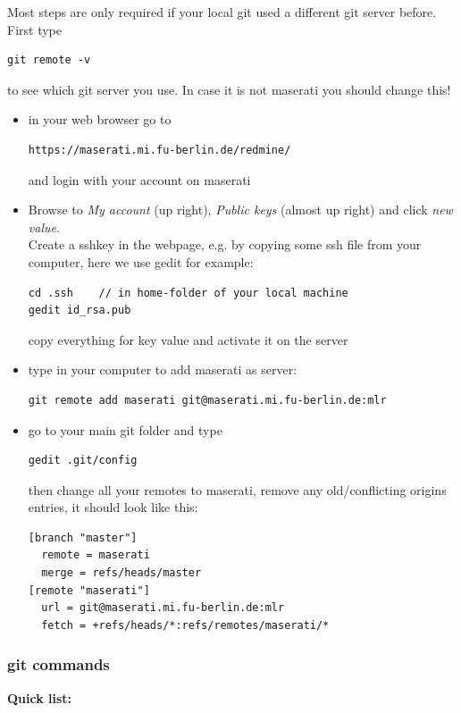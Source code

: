 Most steps are only required if your local git used a different git
server before.
\\
First type
\begin{verbatim}
git remote -v 
\end{verbatim}
to see which git server you use. In case it is not maserati you should
change this!

\begin{itemize}
\item in your web browser go to
\begin{verbatim}
https://maserati.mi.fu-berlin.de/redmine/
\end{verbatim}
and login with your account on maserati

\item  Browse to \textit{My account} (up right), \textit{Public
keys} (almost up right) and click \textit{new value}.  \\
Create a sshkey in the webpage, e.g. by copying some ssh file from your
computer, here we use gedit for example:
\begin{verbatim}
cd .ssh    // in home-folder of your local machine
gedit id_rsa.pub
\end{verbatim} 
copy everything for key value and activate it on the server
\item type in your computer to add maserati as server:
\begin{verbatim}
git remote add maserati git@maserati.mi.fu-berlin.de:mlr 
\end{verbatim}
\item 
go to your main git folder and type
\begin{verbatim}
gedit .git/config
 \end{verbatim}
then change all your remotes to maserati, remove any old/conflicting
origins entries, it should look like this:
 \begin{verbatim}
[branch "master"]
  remote = maserati
  merge = refs/heads/master
[remote "maserati"]
  url = git@maserati.mi.fu-berlin.de:mlr
  fetch = +refs/heads/*:refs/remotes/maserati/*
\end{verbatim}
\end{itemize}





\subsubsection{git commands}


\textbf{Quick list:}

